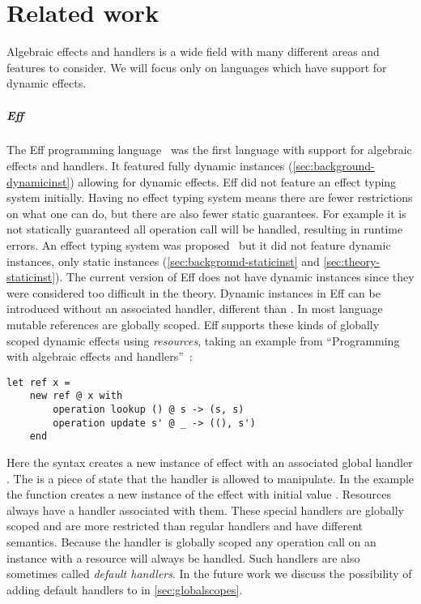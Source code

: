 \chapter{\label{chap:related}Related work}

Algebraic effects and handlers is a wide field with many different areas and features to consider.
We will focus only on languages which have support for dynamic effects.

\paragraph{Eff} \label{sec:eff}
The Eff programming language~\autocite{eff1} was the first language with support for algebraic effects and handlers.
It featured fully dynamic instances (\cref{sec:background-dynamicinst}) allowing for dynamic effects.
Eff did not feature an effect typing system initially.
Having no effect typing system means there are fewer restrictions on what one can do, but there are also fewer static guarantees.
For example it is not statically guaranteed all operation call will be handled, resulting in runtime errors.
An effect typing system was proposed~\autocite{eff2} but it did not feature dynamic instances, only static instances (\cref{sec:background-staticinst} and \cref{sec:theory-staticinst}).
The current version of Eff does not have dynamic instances since they were considered too difficult in the theory.
Dynamic instances in Eff can be introduced without an associated handler, different than \lang{}.
In most language mutable references are globally scoped.
Eff supports these kinds of globally scoped dynamic effects using \emph{resources},
taking an example from ``Programming with algebraic effects and handlers''~\autocite{eff1}:

\begin{verbatim}
let ref x =
	new ref @ x with
		operation lookup () @ s -> (s, s)
		operation update s' @ _ -> ((), s')
	end
\end{verbatim}
Here the  syntax creates a new instance of effect  with an associated global handler .
The  is a piece of state that the handler is allowed to manipulate.
In the example the  function creates a new instance of the  effect with initial value .
Resources always have a handler associated with them.
These special handlers are globally scoped and are more restricted than regular handlers and have different semantics.
Because the handler is globally scoped any operation call on an instance with a resource will always be handled.
Such handlers are also sometimes called \emph{default handlers}.
In the future work we discuss the possibility of adding default handlers to \lang{} in \cref{sec:globalscopes}.
\\\\
\pagebreak
